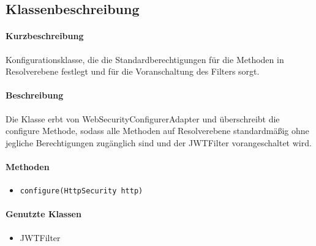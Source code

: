 \subsection*{Klassenbeschreibung}%
\paragraph*{Kurzbeschreibung}
Konfigurationsklasse, die die Standardberechtigungen für die Methoden in Resolverebene festlegt und für die Voranschaltung des Filters sorgt.
\paragraph*{Beschreibung}
Die Klasse erbt von \dq WebSecurityConfigurerAdapter\dq{} und überschreibt die \dq configure\dq{} Methode, sodass 
alle Methoden auf Resolverebene standardmäßig ohne jegliche Berechtigungen zugänglich sind und der JWTFilter vorangeschaltet wird.
\paragraph*{Methoden}
\begin{itemize}
	\item \texttt{configure(HttpSecurity http)}
\end{itemize}	
\paragraph*{Genutzte Klassen}
\begin{itemize}
	\item JWTFilter
\end{itemize}	
